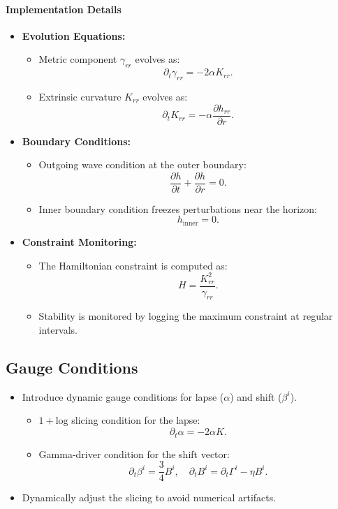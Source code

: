 \documentclass[12pt]{article}
\begin{document}
\paragraph{Implementation Details}
\begin{itemize}
    \item \textbf{Evolution Equations:}
    \begin{itemize}
        \item Metric component $\gamma_{rr}$ evolves as:
        \[
        \partial_t \gamma_{rr} = -2 \alpha K_{rr}.
        \]
        \item Extrinsic curvature $K_{rr}$ evolves as:
        \[
        \partial_t K_{rr} = -\alpha \frac{\partial h_{rr}}{\partial r}.
        \]
    \end{itemize}
    \item \textbf{Boundary Conditions:}
    \begin{itemize}
        \item Outgoing wave condition at the outer boundary:
        \[
        \frac{\partial h}{\partial t} + \frac{\partial h}{\partial r} = 0.
        \]
        \item Inner boundary condition freezes perturbations near the horizon:
        \[
        h_{\text{inner}} = 0.
        \]
    \end{itemize}
    \item \textbf{Constraint Monitoring:}
    \begin{itemize}
        \item The Hamiltonian constraint is computed as:
        \[
        H = \frac{K_{rr}^2}{\gamma_{rr}}.
        \]
        \item Stability is monitored by logging the maximum constraint at regular intervals.
    \end{itemize}
\end{itemize}


\subsection{Gauge Conditions}
\begin{itemize}
    \item Introduce dynamic gauge conditions for lapse ($\alpha$) and shift ($\beta^i$).
    \begin{itemize}
        \item $1+ \text{log}$ slicing condition for the lapse:
        \[
        \partial_t \alpha = -2 \alpha K.
        \]
        \item Gamma-driver condition for the shift vector:
        \[
        \partial_t \beta^i = \frac{3}{4} B^i, \quad \partial_t B^i = \partial_t \Gamma^i - \eta B^i.
        \]
    \end{itemize}
    \item Dynamically adjust the slicing to avoid numerical artifacts.
\end{itemize}
\end{document}
